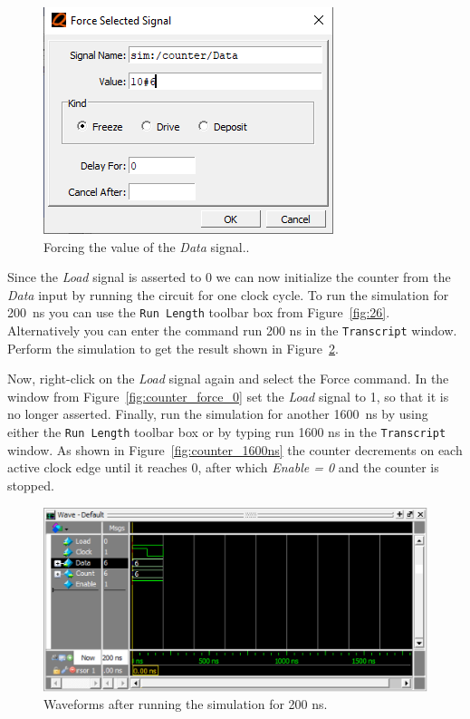 \documentclass[11pt, twoside, pdftex]{article}
\begin{document}
\begin{figure}[H]
   \begin{center}
      \includegraphics[scale=.75]{figures/counter_force_6.png}
       \caption{Forcing the value of the {\it Data} signal..} 
	 \label{fig:counter_force_6}
	 \end{center}
\end{figure}

Since the {\it Load} signal is asserted to 0 we can now initialize the counter from the {\it Data} input 
by running the circuit for one clock cycle. To run the simulation for 200~ns you can use the \texttt{Run
Length} toolbar box from Figure~\ref{fig:26}. Alternatively you can enter the command {\sf run 200 ns} in the
\texttt{Transcript} window. Perform the simulation to get the result shown in Figure~\ref{fig:counter_200ns}.

Now, right-click on the {\it Load} signal again and select the {\sf Force} command. In the window from 
Figure~\ref{fig:counter_force_0} set the {\it Load} signal to 1, so that it is no longer asserted. 
Finally, run the simulation for another 1600~ns by using either the \texttt{Run Length} toolbar box
or by typing {\sf run 1600 ns} in the \texttt{Transcript} window. As shown in 
Figure~\ref{fig:counter_1600ns} the counter decrements on each active clock edge until it reaches 0, after
which {\it Enable = 0} and the counter is stopped. 

\begin{figure}[H]
   \begin{center}
      \includegraphics[scale=.75]{figures/counter_200ns.png}
       \caption{Waveforms after running the simulation for 200 ns.} 
	 \label{fig:counter_200ns}
	 \end{center}
\end{figure}
\end{document}
